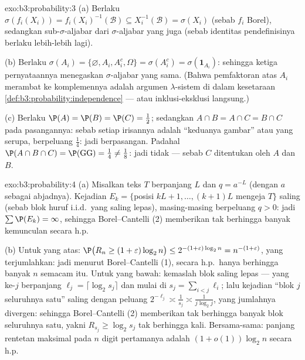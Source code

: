 \begin{solution}{exo:b3:probability:3}
(a) Berlaku $\sigma(f_i(X_i)) = f_i(X_i)^{-1}(\mathcal B) \subseteq
X_i^{-1}(\mathcal B) = \sigma(X_i)$ (sebab $f_i$ Borel), sedangkan
sub-$\sigma$-aljabar dari $\sigma$-aljabar yang  juga
 (sebab identitas pendefinisinya berlaku lebih-lebih lagi).

(b) Berlaku $\sigma(A_i) = \{\varnothing, A_i, A_i^c, \Omega\} =
\sigma(A_i^c) = \sigma(\mathbf 1_{A_i})$: sehingga ketiga
pernyataannya menegaskan  $\sigma$-aljabar yang
sama. (Bahwa pemfaktoran atas $A_i$
merambat ke komplemennya adalah argumen $\lambda$-sistem
di dalam kesetaraan \cref{def:b3:probability:independence}
--- atau inklusi-eksklusi langsung.)

(c) Berlaku $\P(A) = \P(B) = \P(C) = \frac12$; sedangkan $A\cap B = A\cap C =
B\cap C$ pada pasangannya: sebab setiap irisannya adalah ``keduanya gambar'' atau
yang serupa, berpeluang $\frac14$: jadi  berpasangan.
Padahal $\P(A\cap B\cap C) = \P(\text{GG}) = \frac14 \neq
\frac18$: jadi tidak  --- sebab $C$ ditentukan oleh $A$ dan
$B$.
\end{solution}

\begin{solution}{exo:b3:probability:4}
(a) Misalkan teks $T$ berpanjang $L$ dan $q = a^{-L}$ (dengan $a$
sebagai  abjadnya). Kejadian $E_k = \{$posisi $kL+1,
\dots, (k+1)L$ mengeja $T\}$ saling  (sebab blok huruf i.i.d.\ yang
saling lepas), masing-masing berpeluang $q > 0$: jadi $\sum\P(E_k)
= \infty$, sehingga Borel--Cantelli (2) memberikan tak berhingga banyak
kemunculan secara h.p.

(b) Untuk yang atas: $\P\bigl(R_n \geq (1+\varepsilon)\log_2n\bigr)
\leq 2^{-(1+\varepsilon)\log_2n} = n^{-(1+\varepsilon)}$,
yang terjumlahkan: jadi menurut Borel--Cantelli (1), secara h.p.\ hanya berhingga banyak
$n$ semacam itu. Untuk yang bawah: kemaslah blok saling lepas --- yang ke-$j$
berpanjang $\ell_j = \lceil\log_2s_j\rceil$ dan mulai di $s_j =
\sum_{i<j}\ell_i$; lalu kejadian ``blok $j$ seluruhnya satu'' saling
 dengan peluang $2^{-\ell_j} \asymp
\frac1{s_j} \asymp \frac1{j\log_2 j}$, yang jumlahnya divergen:
sehingga Borel--Cantelli (2) memberikan tak berhingga banyak blok seluruhnya satu,
yakni $R_{s_j} \geq \log_2 s_j$ tak berhingga kali. Bersama-sama:
panjang rentetan maksimal pada $n$ digit pertamanya adalah
$(1 + o(1))\log_2n$ secara h.p.
\end{solution}

